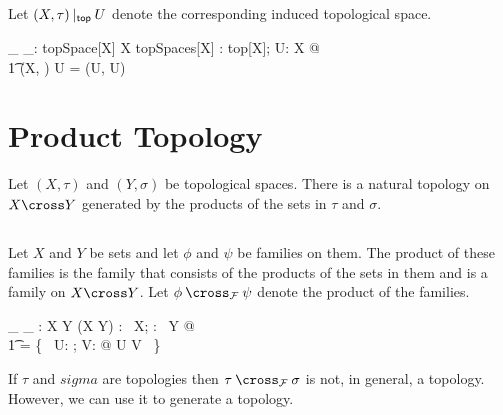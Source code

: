 \documentclass[11pt, oneside]{article}
\begin{document}
\subsection{}

Let $(X, \tau) \mathbin{|_{\mathsf{top}}} U$ denote the corresponding induced topological space.

\begin{gendef}[X]
	\_ \inducedTopSp \_: topSpace[X] \cross \power X \fun topSpaces[X]
\where
	\forall \tau: top[X]; U: \power X @ \\
	\t1	(X, \tau) \inducedTopSp U = (U, \tau \inducedFam U)
\end{gendef}

\section{Product Topology}

Let $(X, \tau)$ and $(Y, \sigma) $ be topological spaces.
There is a natural topology on $X \cross Y$ generated by the products of the sets in $\tau$ and $\sigma$.

\subsection{}

Let $X$ and $Y$ be sets and let $\phi$ and $\psi$ be families on them.
The product of these families is the family that consists of the products of the sets in them and is a family on $X \cross Y$.
Let $\phi \prodFam \psi$ denote the product of the families.

\begin{gendef}[X,Y]
	\_ \prodFam \_ : \family X \cross \family Y \fun \family(X \cross Y)
\where
	\forall \phi: \family~X; \psi: \family~Y @ \\
	\t1	\phi \prodFam \psi = \{~ U: \phi; V: \psi @ U \cross V ~\}
\end{gendef}

\begin{remark}

If $\tau$ and $sigma$ are topologies then $\tau \prodFam \sigma$ is not, in general, a topology.
However, we can use it to generate a topology.

\end{remark}

\subsection{}
\end{document}
